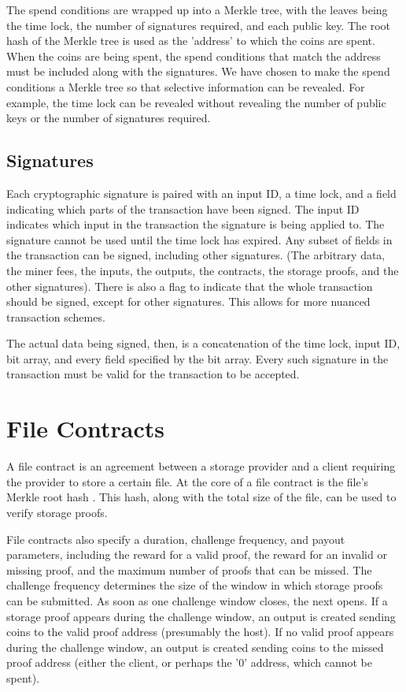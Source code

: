 \documentclass[twocolumn]{article}
\begin{document}
The spend conditions are wrapped up into a Merkle tree, with the leaves being the time lock, the number of signatures required, and each public key.
The root hash of the Merkle tree is used as the 'address' to which the coins are spent.
When the coins are being spent, the spend conditions that match the address must be included along with the signatures.
We have chosen to make the spend conditions a Merkle tree so that selective information can be revealed.
For example, the time lock can be revealed without revealing the number of public keys or the number of signatures required.

\subsection{Signatures}
Each cryptographic signature is paired with an input ID, a time lock, and a field indicating which parts of the transaction have been signed.
The input ID indicates which input in the transaction the signature is being applied to.
The signature cannot be used until the time lock has expired.
Any subset of fields in the transaction can be signed, including other signatures. (The arbitrary data, the miner fees, the inputs, the outputs, the contracts, the storage proofs, and the other signatures).
There is also a flag to indicate that the whole transaction should be signed, except for other signatures.
This allows for more nuanced transaction schemes.

The actual data being signed, then, is a concatenation of the time lock, input ID, bit array, and every field specified by the bit array.
Every such signature in the transaction must be valid for the transaction to be accepted.

\section{File Contracts}
\label{sec:contracts}
A file contract is an agreement between a storage provider and a client requiring the provider to store a certain file.
At the core of a file contract is the file's Merkle root hash \cite{merkle}.
This hash, along with the total size of the file, can be used to verify storage proofs.

File contracts also specify a duration, challenge frequency, and payout parameters, including the reward for a valid proof, the reward for an invalid or missing proof, and the maximum number of proofs that can be missed.
The challenge frequency determines the size of the window in which storage proofs can be submitted.
As soon as one challenge window closes, the next opens.
If a storage proof appears during the challenge window, an output is created sending coins to the valid proof address (presumably the host).
If no valid proof appears during the challenge window, an output is created sending coins to the missed proof address (either the client, or perhaps the '0' address, which cannot be spent).
\end{document}
